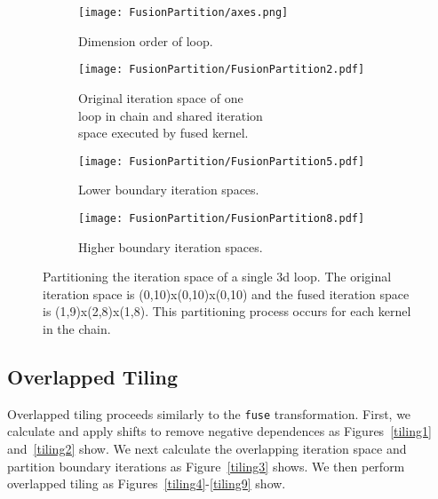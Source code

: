 \begin{figure}
\captionsetup[subfigure]{justification=centering}
	\centering
	\begin{subfigure}[t]{0.33\textwidth}
		\centering
		\texttt{[image: FusionPartition/axes.png]}
		\caption{Dimension order of loop.}
	\end{subfigure}
	
	
	\begin{subfigure}[t]{0.33\textwidth}
		\centering
		\texttt{[image: FusionPartition/FusionPartition2.pdf]}
		\caption{Original iteration space of one \\ loop in chain and shared iteration \\ space executed by fused kernel.}
		\label{sharedSpace}
	\end{subfigure}

	\begin{subfigure}[t]{0.33\textwidth}
		\centering
		\texttt{[image: FusionPartition/FusionPartition5.pdf]}
		\caption{Lower boundary iteration spaces.}
		\label{preshare}
	\end{subfigure}

	\begin{subfigure}[t]{0.33\textwidth}
		\centering
		\texttt{[image: FusionPartition/FusionPartition8.pdf]}
		\caption{Higher boundary iteration spaces.}
		\label{postshare}
	\end{subfigure}
\caption{Partitioning the iteration space of a single 3d loop. The original iteration space is (0,10)x(0,10)x(0,10) and the fused iteration space is (1,9)x(2,8)x(1,8). This partitioning process occurs for each kernel in the chain.}
\label{fusionPartition}
\end{figure}




\subsection{Overlapped Tiling}

Overlapped tiling proceeds similarly to the \verb.fuse. transformation. 
First, we calculate and apply shifts to remove negative dependences as
Figures~\ref{tiling1} and~\ref{tiling2} show.
We next calculate the overlapping iteration space and partition boundary
iterations as Figure~\ref{tiling3} shows.
We then perform overlapped tiling as Figures~\ref{tiling4}-\ref{tiling9} show.

